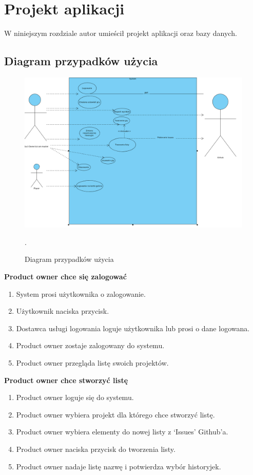 \chapter{Projekt aplikacji}
W niniejszym rozdziale autor umieścił projekt aplikacji oraz bazy danych.
\section{Diagram przypadków użycia}
\begin{figure}[H]
	\centering\includegraphics[width=\textwidth]{img/UseCase.png}
	\caption{Diagram przypadków użycia}.\label{rys:useCase}
\end{figure}
\textbf{Product owner chce się zalogować}
\begin{enumerate}
    \item System prosi użytkownika o zalogowanie.
    \item Użytkownik naciska przycisk.
    \item Dostawca usługi logowania loguje użytkownika lub prosi o dane logowana.
    \item Product owner zostaje zalogowany do systemu.
    \item Product owner przegląda listę swoich projektów.
\end{enumerate}
\textbf{Product owner chce stworzyć listę}
\begin{enumerate}
    \item Product owner loguje się do systemu.
    \item Product owner wybiera projekt dla którego chce stworzyć listę.
    \item Product owner wybiera elementy do nowej listy z `Issues' Github'a.
    \item Product owner naciska przycisk do tworzenia listy.
    \item Product owner nadaje listę nazwę i potwierdza wybór historyjek.
\end{enumerate}
